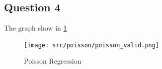 \documentclass{article}
\begin{document}
\subsection{}

\subsection{Question 4}
The graph show in \ref{fig:Poisson} 
\begin{figure}[h]
	\centering
	\texttt{[image: src/poisson/poisson\_valid.png]}
	\caption{Poisson Regression}
	\label{fig:Poisson}
\end{figure}
\end{document}
